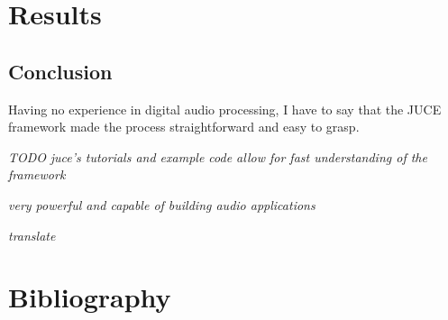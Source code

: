 \documentclass[12pt, a4paper, hidelinks]{article}
\begin{document}
	
	
	
	\newpage
	\section{Results}
	
	
	


	\newpage
	\subsection{Conclusion}
	Having no experience in digital audio processing, I have to say that the JUCE framework made the process straightforward and easy to grasp.

\textit{TODO}
\textit{	juce's tutorials and example code allow for fast understanding of the framework}

\textit{	very powerful and capable of building audio applications}

\textit{translate}
	
		
	\newpage
	\section{Bibliography}
	\printbibliography
	
\end{document}
